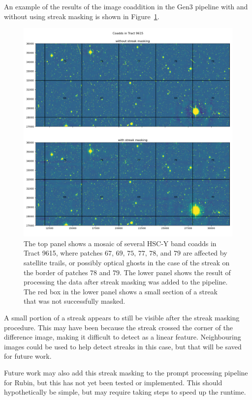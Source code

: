 \documentclass[DM,authoryear,toc]{lsstdoc}
\begin{document}
An example of the results of the image coaddition in the Gen3 pipeline with and without using streak masking is shown in Figure~\ref{fig: pipeline demo}.
\begin{figure}
\includegraphics[width=\columnwidth]{figures/streakMasking_tractdemo_gen3_w_2021_42.png}
\caption{The top panel shows a mosaic of several HSC-Y band coadds in Tract 9615, where patches $67$, $69$, $75$, $77$, $78$, and $79$ are affected by satellite trails, or possibly optical ghosts in the case of the streak on the border of patches $78$ and $79$. The lower panel shows the result of processing the data after streak masking was added to the pipeline. The red box in the lower panel shows a small section of a streak that was not successfully masked.}
\label{fig: pipeline demo}
\end{figure}
A small portion of a streak appears to still be visible after the streak masking procedure. This may have been because the streak crossed the corner of the difference image, making it difficult to detect as a linear feature. Neighbouring images could be used to help detect streaks in this case, but that will be saved for future work.

Future work may also add this streak masking to the prompt processing pipeline for Rubin, but this has not yet been tested or implemented. This should hypothetically be simple, but may require taking steps to speed up the runtime.
\end{document}
